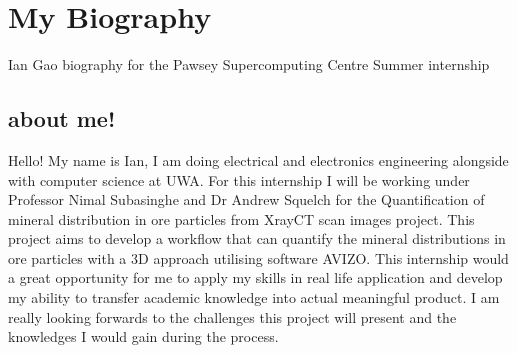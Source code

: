 \section{My Biography}
Ian Gao biography for the Pawsey Supercomputing Centre Summer internship
\subsection{about me!}
Hello! My name is Ian, I am doing electrical and electronics engineering alongside with computer science at UWA. 
For this internship I will be working under Professor Nimal Subasinghe and Dr Andrew Squelch for the Quantification of mineral distribution in ore particles from XrayCT scan images project. 
This project aims to develop a workflow that can quantify the mineral distributions in ore particles with a 3D approach utilising software AVIZO.
This internship would a great opportunity for me to apply my skills in real life application and develop my ability to transfer academic knowledge into  actual meaningful product. I am really looking forwards to the challenges this project will present and the knowledges I would gain during the process. 
